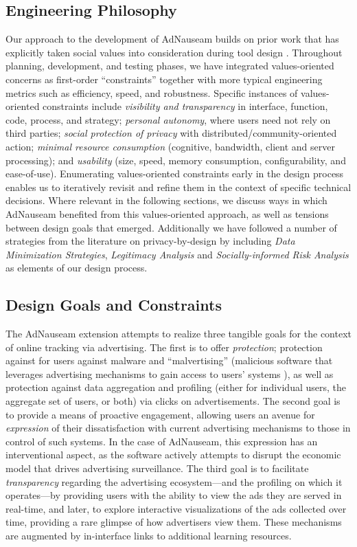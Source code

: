 \documentclass[conference]{IEEEtran}
\begin{document}
\subsection{Engineering Philosophy}

Our approach to the development of AdNauseam builds on prior work that has explicitly taken social values into consideration during tool design \cite{Friedman,Flanagan,Howe-1}. Throughout planning, development, and testing phases, we have integrated values-oriented concerns as first-order “constraints” together with more typical engineering metrics such as efficiency, speed, and robustness. Specific instances of values-oriented constraints include \emph{visibility and transparency} in interface, function, code, process, and strategy; \emph{personal autonomy}, where users need not rely on third parties; \emph{social protection of privacy} with distributed/community-oriented action; \emph{minimal resource consumption} (cognitive, bandwidth, client and server processing); and \emph{usability} (size, speed, memory consumption, configurability, and ease-of-use). Enumerating values-oriented constraints early in the design process enables us to iteratively revisit and refine them in the context of specific technical decisions. Where relevant in the following sections, we discuss ways in which AdNauseam benefited from this values-oriented approach, as well as tensions between design goals that emerged. Additionally we have followed a number of strategies from the literature on privacy-by-design \cite{Gurses-0, Hoepman, Gurses-1, Hansen, Cavoukian} by including \emph{Data Minimization Strategies}, \emph{Legitimacy Analysis} and \emph{Socially-informed Risk Analysis} as elements of our design process.

\subsection{Design Goals and Constraints}

The AdNauseam extension attempts to realize three tangible goals for the context of online tracking via advertising. The first is to offer \emph{protection}; protection against for users against malware and “malvertising” (malicious software that leverages advertising mechanisms to gain access to users' systems \cite{Mansfield}), as well as protection against data aggregation and profiling (either for individual users, the aggregate set of users, or both)  via clicks on advertisements. The second goal is to provide a means of proactive engagement, allowing users an avenue for \emph{expression} of their dissatisfaction with current advertising mechanisms to those in control of such systems. In the case of AdNauseam, this expression has an interventional aspect, as the software actively attempts to disrupt the economic model that drives advertising surveillance. The third goal is to facilitate \emph{transparency} regarding the advertising ecosystem---and the profiling on which it operates---by providing users with the ability to view the ads they are served in real-time, and later, to explore interactive visualizations of the ads collected over time, providing a rare glimpse of how advertisers view them. These mechanisms are augmented by in-interface links to additional learning resources.
\end{document}
